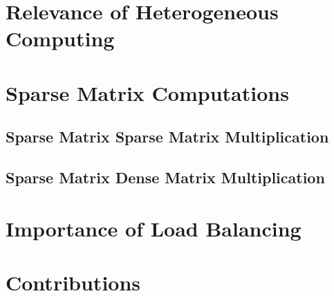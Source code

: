 \section{Relevance of Heterogeneous Computing}

\section{Sparse Matrix Computations}

\subsection{Sparse Matrix Sparse Matrix Multiplication}
\subsection{Sparse Matrix Dense Matrix Multiplication}

\section{Importance of Load Balancing}

\section{Contributions}